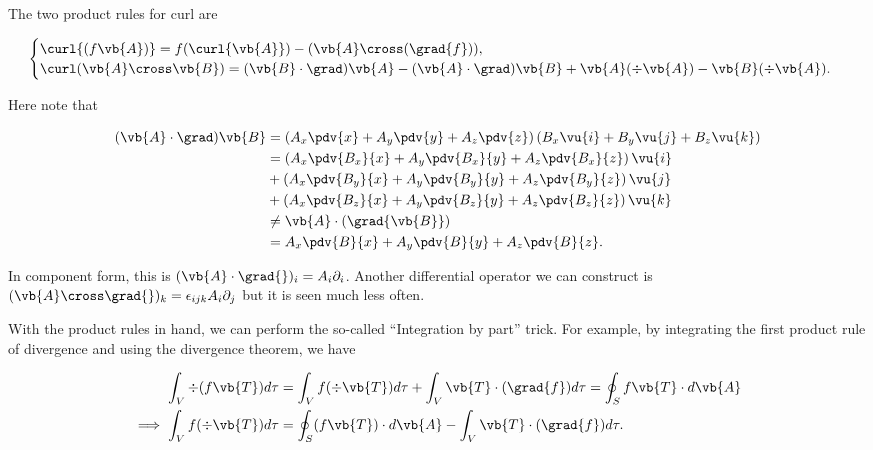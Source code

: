 \documentclass[english,a4paper,12pt]{report}
\begin{document}
	
The two product rules for curl are
	
\begin{equation}
\begin{cases} 
	\curl{(f\vb{A})} = f(\curl{\vb{A}}) - (\vb{A} \cross (\grad{f})), \\
	\curl (\vb{A} \cross \vb{B}) = (\vb{B} \cdot \grad)\vb{A} - (\vb{A} \cdot \grad)\vb{B} + \vb{A}(\div{\vb{A}}) - \vb{B}(\div{\vb{A}}). 
\end{cases}
\end{equation}

	
Here note that

\begin{equation} 
	\begin{aligned} 
		(\vb{A} \cdot \grad) \vb{B} &= \left(A_x\pdv{x} + A_y\pdv{y} + A_z\pdv{z}\right)\left(B_x\vu{i} + B_y\vu{j} + B_z\vu{k}\right) \\ &= \left(A_x\pdv{B_x}{x} + A_y\pdv{B_x}{y} + A_z\pdv{B_x}{z}\right)\vu{i} \\ &+ \left(A_x\pdv{B_y}{x} + A_y\pdv{B_y}{y} + A_z\pdv{B_y}{z}\right)\vu{j} \\ &+ \left(A_x\pdv{B_z}{x} + A_y\pdv{B_z}{y} + A_z\pdv{B_z}{z}\right)\vu{k} \\ &\neq \vb{A} \cdot (\grad{\vb{B}}) \\ &= A_x\pdv{B}{x} + A_y\pdv{B}{y} + A_z\pdv{B}{z} .
	\end{aligned} 
\end{equation}

In component form, this is \((\vb{A} \cdot \grad{} )_{i} = A_{i}\partial _{i}   \). Another differential operator we can construct is \((\vb{A} \cross  \grad{} )_{k} = \epsilon _{ijk} A_{i}\partial _{j}     \) but it is seen much less often. 
	
With the product rules in hand, we can perform the so-called ``Integration by part'' trick. For example, by integrating the first product rule of divergence and using the divergence theorem, we have
	
\begin{equation} 
	\begin{aligned}
	\int_{V} \div{(f\vb{T})} d\tau &= \int_{V} f(\div{\vb{T}}) d\tau + \int_{V} \vb{T} \cdot (\grad{f}) d\tau = \oint_{S} f\vb{T} \cdot d\vb{A} \\
	\implies \int_{V} f(\div{\vb{T}}) d\tau &= \oint_{S} (f\vb{T}) \cdot d\vb{A} - \int_{V} \vb{T} \cdot (\grad{f}) d\tau. 
	\end{aligned}
\end{equation}
	
\end{document}
